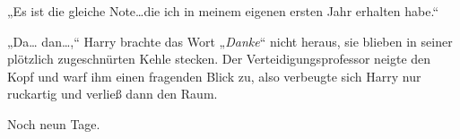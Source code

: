 „Es ist die gleiche Note…die ich in meinem eigenen ersten Jahr erhalten habe.“

„Da… dan…,“
Harry brachte das Wort „\emph{Danke}“ nicht heraus, sie blieben in seiner plötzlich zugeschnürten Kehle stecken.
Der Verteidigungsprofessor neigte den Kopf und warf ihm einen fragenden Blick zu, also verbeugte sich Harry nur ruckartig und verließ dann den Raum.

Noch neun Tage.


